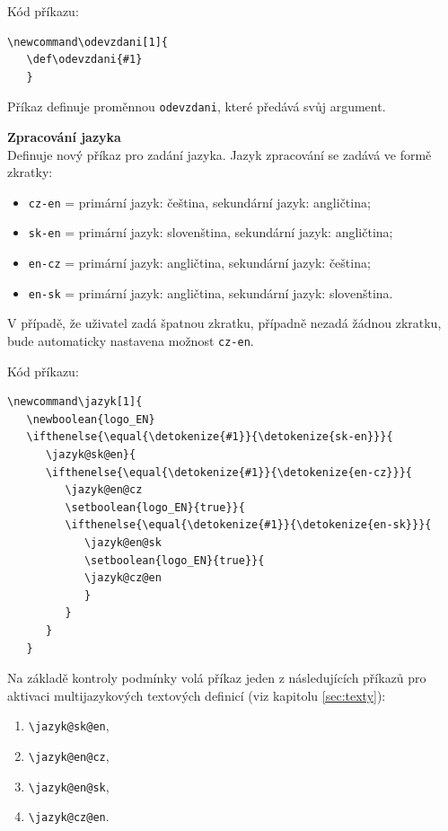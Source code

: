 Kód příkazu:

\begin{verbatim}
\newcommand\odevzdani[1]{
   \def\odevzdani{#1}
   }
\end{verbatim}

Příkaz definuje proměnnou \verb|odevzdani|, které předává svůj argument.

\vspace{8pt}
\textbf{Zpracování jazyka}\\
Definuje nový příkaz pro zadání jazyka. Jazyk zpracování se zadává ve formě zkratky:

\begin{itemize}[label={-}]
	\item \verb|cz-en| = primární jazyk: čeština, sekundární jazyk: angličtina;
	\item \verb|sk-en| = primární jazyk: slovenština, sekundární jazyk: angličtina;
	\item \verb|en-cz| = primární jazyk: angličtina, sekundární jazyk: čeština;
	\item \verb|en-sk| = primární jazyk: angličtina, sekundární jazyk: slovenština.
\end{itemize}

V případě, že uživatel zadá špatnou zkratku, případně nezadá žádnou zkratku, bude automaticky nastavena možnost \verb|cz-en|.

Kód příkazu:

\begin{verbatim}
\newcommand\jazyk[1]{
   \newboolean{logo_EN}	
   \ifthenelse{\equal{\detokenize{#1}}{\detokenize{sk-en}}}{
      \jazyk@sk@en}{
      \ifthenelse{\equal{\detokenize{#1}}{\detokenize{en-cz}}}{
         \jazyk@en@cz
         \setboolean{logo_EN}{true}}{
         \ifthenelse{\equal{\detokenize{#1}}{\detokenize{en-sk}}}{
            \jazyk@en@sk
            \setboolean{logo_EN}{true}}{
            \jazyk@cz@en
            }
         }
      }
   }
\end{verbatim}

Na základě kontroly podmínky volá příkaz jeden z následujících příkazů pro aktivaci multijazykových textových definicí (viz kapitolu \ref{sec:texty}):

\begin{enumerate}
	\item \verb|\jazyk@sk@en|,
	\item \verb|\jazyk@en@cz|,
	\item \verb|\jazyk@en@sk|,
	\item \verb|\jazyk@cz@en|.
\end{enumerate}

